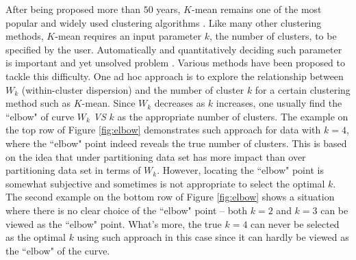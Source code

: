 \documentclass[11pt]{article}
\begin{document}
After being proposed more than $50$ years, $K$-mean remains one of the most
popular and widely used clustering algorithms \citep{jain2010data}. Like many
other clustering methods, $K$-mean requires an input parameter $k$, the number
of clusters, to be specified by the user. Automatically and quantitatively
deciding such parameter is important and yet unsolved problem
\citep{fujita2014non}. Various methods have been proposed to tackle this
difficulty. One ad hoc approach is to explore the relationship between $W_k$
(within-cluster dispersion) and the number of cluster $k$ for a certain
clustering method such as $K$-mean. Since $W_k$ decreases as $k$ increases,
one usually find the ``elbow" of curve $W_k$ \textsl{VS} $k$ as the
appropriate number of clusters. The example on the top row of Figure
\ref{fig:elbow} demonstrates such approach for data with $k=4$, where the
``elbow" point indeed reveals the true number of clusters. This is based on
the idea that under partitioning data set has more impact than over
partitioning data set in terms of $W_k$. However, locating the ``elbow" point
is somewhat subjective and sometimes is not appropriate to select the optimal
$k$. The second example on the bottom row of Figure \ref{fig:elbow} shows a  situation where there is no clear choice of the ``elbow" point -- both $k=2$ and $k=3$ can be viewed as the ``elbow" point. What's more, the true $k=4$ can never be selected as the optimal $k$ using such approach in this case since it can hardly be viewed as the ``elbow" of the curve.
\end{document}
